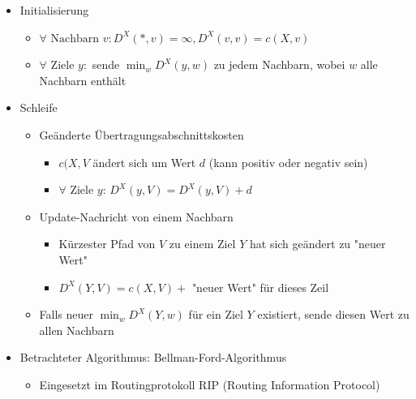       \begin{itemize}
        \item Initialisierung
          \begin{itemize}
            \item $\forall\text{ Nachbarn }v: D^X(*,v)=\infty,D^X(v,v)=c(X,v)$
            \item $\forall$ Ziele $y:$ sende $\min_wD^X(y,w)$ zu jedem Nachbarn, wobei $w$ alle
              Nachbarn enthält
          \end{itemize}
        \item Schleife
          \begin{itemize}
            \item Geänderte Übertragungsabschnittskosten
              \begin{itemize}
                \item $c(X,V$ ändert sich um Wert $d$ (kann positiv oder negativ sein)
                \item $\forall$ Ziele $y$: $D^X(y,V)=D^X(y,V)+d$
              \end{itemize}
            \item Update-Nachricht von einem Nachbarn
              \begin{itemize}
                \item Kürzester Pfad von $V$ zu einem Ziel $Y$ hat sich geändert zu "neuer Wert"
                \item $D^X(Y,V)=c(X,V)+$ "neuer Wert" für dieses Zeil
              \end{itemize}
            \item Falls neuer $\min_wD^X(Y,w)$ für ein Ziel $Y$ existiert, sende diesen Wert zu allen
              Nachbarn
          \end{itemize}
        \item Betrachteter Algorithmus: Bellman-Ford-Algorithmus
          \begin{itemize}
            \item Eingesetzt im Routingprotokoll RIP (Routing Information Protocol)
          \end{itemize}
      \end{itemize}
